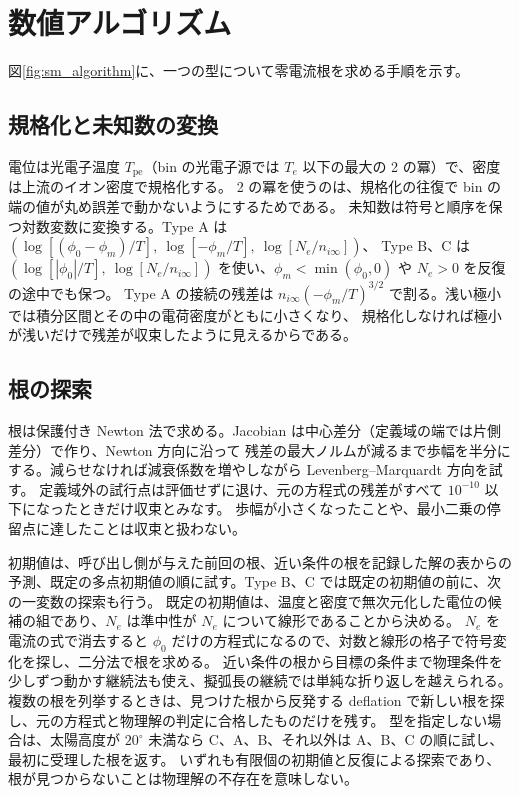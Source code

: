 

\section{数値アルゴリズム}
\label{sec:sm_algorithm}
図\ref{fig:sm_algorithm}に、一つの型について零電流根を求める手順を示す。

\subsection{規格化と未知数の変換}
電位は光電子温度 $T_{\mathrm{pe}}$（bin の光電子源では $T_e$ 以下の最大の 2 の冪）で、密度は上流のイオン密度で規格化する。
2 の冪を使うのは、規格化の往復で bin の端の値が丸め誤差で動かないようにするためである。
未知数は符号と順序を保つ対数変数に変換する。Type A は $(\log[(\phi_0-\phi_m)/T],\ \log[-\phi_m/T],\ \log[N_e/n_{i\infty}])$、
Type B、C は $(\log[|\phi_0|/T],\ \log[N_e/n_{i\infty}])$ を使い、$\phi_m<\min(\phi_0,0)$ や $N_e>0$ を反復の途中でも保つ。
Type A の接続の残差は $n_{i\infty}(-\phi_m/T)^{3/2}$ で割る。浅い極小では積分区間とその中の電荷密度がともに小さくなり、
規格化しなければ極小が浅いだけで残差が収束したように見えるからである。

\subsection{根の探索}
根は保護付き Newton 法で求める。Jacobian は中心差分（定義域の端では片側差分）で作り、Newton 方向に沿って
残差の最大ノルムが減るまで歩幅を半分にする。減らせなければ減衰係数を増やしながら Levenberg--Marquardt 方向を試す。
定義域外の試行点は評価せずに退け、元の方程式の残差がすべて $10^{-10}$ 以下になったときだけ収束とみなす。
歩幅が小さくなったことや、最小二乗の停留点に達したことは収束と扱わない。

初期値は、呼び出し側が与えた前回の根、近い条件の根を記録した解の表からの予測、既定の多点初期値の順に試す。Type B、C では既定の初期値の前に、次の一変数の探索も行う。
既定の初期値は、温度と密度で無次元化した電位の候補の組であり、$N_e$ は準中性が $N_e$ について線形であることから決める。
$N_e$ を電流の式で消去すると $\phi_0$ だけの方程式になるので、対数と線形の格子で符号変化を探し、二分法で根を求める。
近い条件の根から目標の条件まで物理条件を少しずつ動かす継続法も使え、擬弧長の継続では単純な折り返しを越えられる。
複数の根を列挙するときは、見つけた根から反発する deflation で新しい根を探し、元の方程式と物理解の判定に合格したものだけを残す。
型を指定しない場合は、太陽高度が $20^\circ$ 未満なら C、A、B、それ以外は A、B、C の順に試し、最初に受理した根を返す。
いずれも有限個の初期値と反復による探索であり、根が見つからないことは物理解の不存在を意味しない。

